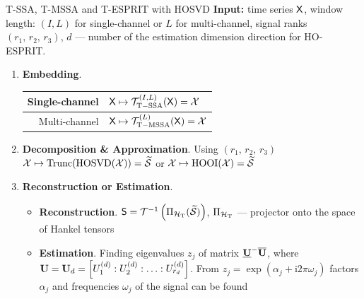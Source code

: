 \documentclass[pdf, unicode, ucs, notheorems]{beamer}
\theoremstyle{definition}
\begin{document}
\begin{frame}{T-SSA, T-MSSA and T-ESPRIT with HOSVD}
  \textbf{Input:} time series $\mathsf{X}$,
  window length: $(I, L)$ for single-channel or $L$ for multi-channel,
  signal ranks $(r_1,\, r_2,\, r_3)$, $d$ --- number of the
  estimation dimension direction for HO-ESPRIT.
  \vspace{0.4cm}\\
  \begin{enumerate}
    \item \textbf{Embedding}.
      \begin{tabular}{r|l}
        Single-channel & $\mathsf{X} \mapsto\mathcal{T}_{\mathrm{T-SSA}}^{(I,
        L)}(\mathsf{X}) = \mathcal{X}$ \\ \hline
        Multi-channel &
        $\mathsf{X} \mapsto \mathcal{T}_{\mathrm{T-MSSA}}^{(L)}(\mathsf{X}) = \mathcal{X}$
      \end{tabular}
      \vspace{0.2cm}

    \item \textbf{Decomposition \& Approximation}. Using $(r_1,\,
      r_2,\, r_3)$\\\smallskip
      $\mathcal{X} \mapsto
      \operatorname{Trunc}(\operatorname{HOSVD}(\mathcal{X})) =
      \widetilde{\mathcal{S}}$ or
      $\mathcal{X} \mapsto \operatorname{HOOI}(\mathcal{X}) = \widetilde{\mathcal{S}}$
      \vspace{0.2cm}

    \item \textbf{Reconstruction or Estimation}. \\
      \begin{itemize}
        \item \textbf{Reconstruction}.
          $\mathsf{S} = \mathcal{T}^{-1}
          \left(\Pi_{\mathcal{H}_{\mathrm{T}}} (\widetilde{\mathcal{S}})\right)$,
          $\Pi_{\mathcal{H}_{\mathrm{T}}}$ --- projector onto the space of
          Hankel tensors
        \item \textbf{Estimation}. Finding eigenvalues $z_j$ of
          matrix $\underline{\mathbf{U}}^{-}\overline{\mathbf{U}}$, where
          $\mathbf{U} = \mathbf{U}_d = \left[U_1^{(d)}:U_2^{(d)}:\ldots
          :U_{r_d}^{(d)}\right]$.
          From $z_j = \exp(\alpha_j + \mathrm{i}2\pi\omega_j)$
          factors $\alpha_j$ and frequencies $\omega_j$ of
          the signal can be found
      \end{itemize}
  \end{enumerate}
\end{frame}
\end{document}
